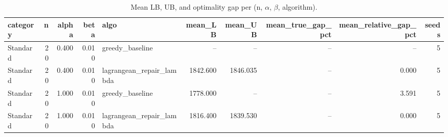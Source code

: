 \begin{table}
\caption{Mean LB, UB, and optimality gap per (n, $\alpha$, $\beta$, algorithm).}
\label{tab:bounds_and_gap}
\begin{tabular}{lrrrlrrrrr}
\toprule
category & n & alpha & beta & algo & mean\_LB & mean\_UB & mean\_true\_gap\_pct & mean\_relative\_gap\_pct & seeds \\
\midrule
Standard & 20 & 0.400 & 0.010 & greedy\_baseline & -- & -- & -- & -- & 5 \\
Standard & 20 & 0.400 & 0.010 & lagrangean\_repair\_lambda & 1842.600 & 1846.035 & -- & 0.000 & 5 \\
Standard & 20 & 1.000 & 0.010 & greedy\_baseline & 1778.000 & -- & -- & 3.591 & 5 \\
Standard & 20 & 1.000 & 0.010 & lagrangean\_repair\_lambda & 1816.400 & 1839.530 & -- & 0.000 & 5 \\
\bottomrule
\end{tabular}
\end{table}
